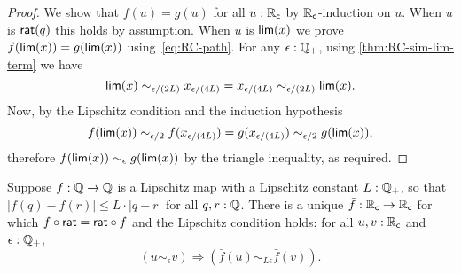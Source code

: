 \begin{proof}
  We show that $f(u) = g(u)$ for all $u : \mathbb{R}_\mathsf{c}$ by $\mathbb{R}_\mathsf{c}$-induction on $u$. When $u$ is
  $\mathsf{rat}(q)$ this holds by assumption. When $u$ is $\mathsf{lim}(x)$ we prove $f(\mathsf{lim}(x)) =
  g(\mathsf{lim}(x))$ using~\eqref{eq:RC-path}. For any $\epsilon : \mathbb{Q}_{+}$, using \autoref{thm:RC-sim-lim-term} we have
  \begin{equation*}
    \mathsf{lim}(x) \sim_{\epsilon/(2 L)}
    x_{\epsilon/(4 L)} =
    x_{\epsilon/(4 L)} \sim_{\epsilon/(2 L)}
    \mathsf{lim}(x).
  \end{equation*}
  Now, by the Lipschitz condition and the induction hypothesis
  \begin{equation*}
    f(\mathsf{lim}(x)) \sim_{\epsilon/2}
    f(x_{\epsilon/(4L)}) =
    g(x_{\epsilon/(4L)}) \sim_{\epsilon/2}
    g(\mathsf{lim}(x)),
  \end{equation*}
  therefore $f(\mathsf{lim}(x)) \sim_\epsilon g(\mathsf{lim}(x))$ by the triangle inequality, as required.
\end{proof}

\begin{lem}\label{RC-extend-Q-Lipschitz}
  Suppose $f : \mathbb{Q} \to \mathbb{Q}$ is a Lipschitz map with a Lipschitz constant $L : \mathbb{Q}_{+}$, so that
  $|f(q) - f(r)| \leq L \cdot |q - r|$ for all $q, r : \mathbb{Q}$. There is a unique $\bar{f} :
  \mathbb{R}_\mathsf{c} \to \mathbb{R}_\mathsf{c}$ for which $\bar{f} \circ \mathsf{rat} = \mathsf{rat} \circ f$ and the Lipschitz
  condition holds: for all $u, v : \mathbb{R}_\mathsf{c}$ and $\epsilon : \mathbb{Q}_{+}$,
  \begin{equation*}
    (u \sim_\epsilon v) \Rightarrow (\bar{f}(u) \sim_{L \epsilon} \bar{f}(v)).
  \end{equation*}
\end{lem}

